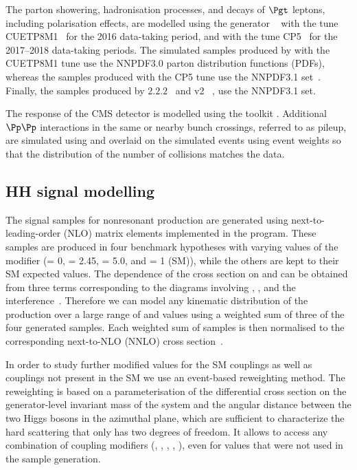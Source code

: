 The parton showering, hadronisation processes, and decays of $\Pgt$ leptons, including polarisation effects, are modelled using the generator ~\cite{Sjostrand:2014zea} with the tune \textsc{CUETP8M1}~\cite{PYTHIA_CUETP8M1tune_CMS} for the 2016 data-taking period, and with the tune \textsc{CP5}~\cite{CP5tune_CMS} for the 2017--2018 data-taking periods.
The simulated samples produced by \PYTHIA with the \textsc{CUETP8M1} tune use the \textsc{NNPDF3.0} parton distribution functions (PDFs), whereas the samples produced with the \textsc{CP5} tune use the \textsc{NNPDF3.1} set~\cite{NNPDF1,NNPDF3,Ball:2017nwa}. Finally, the samples produced by \MGvATNLO $2.2.2$~\cite{MadGraph5_aMCatNLO,Alwall_2007,Frederix_2012} and \POWHEG v2 ~\cite{POWHEG1,POWHEG2,POWHEG3}, use the \textsc{NNPDF3.1} set.

The response of the CMS detector is modelled using the \GEANTfour toolkit \cite{geant4}. Additional $\Pp\Pp$ interactions in the same or nearby bunch crossings, referred to as pileup, are simulated using \PYTHIA and overlaid on the simulated events using event weights so that the distribution of the number of collisions matches the data.

\subsection{HH signal modelling}
\label{sec:HHsimulation}



The \HH signal samples for nonresonant \GGF production are generated using next-to-leading-order (NLO) matrix elements implemented in the \POWHEG program.
These samples are produced in four benchmark hypotheses with varying values of the \klambda modifier (\klambda = 0, \klambda = 2.45, \klambda = 5.0, and \klambda = 1 (SM)), while the others are kept to their SM expected values.
The dependence of the \GGF \HH cross section on \klambda and \ktop can be obtained from three terms corresponding to the diagrams involving \klambda, \ktop, and the interference~\cite{Heinrich_2019}. Therefore we can model any kinematic distribution of the \GGF production over a large range of \klambda and \ktop values using a weighted sum of three of the four generated samples. Each weighted sum of samples is then normalised to the corresponding next-to-NLO (NNLO) cross section~\cite{Grazzini:2018bsd}.

In order to study further modified values for the SM couplings as well as couplings not present in the SM we use an event-based reweighting method. The reweighting is based on a parameterisation of the differential cross section on the generator-level invariant mass of the \HH system and the angular distance between the two Higgs bosons in the azimuthal plane, which are sufficient to characterize the hard scattering that only has two degrees of freedom.
It allows to access any combination of coupling modifiers (\klambda, \ktop, \ctwo, \cg, \cgg), even for values that were not used in the sample generation.

